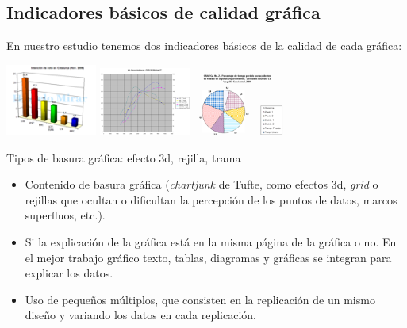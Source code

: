 \documentclass{tufte-handout}\usepackage{graphicx, color}
\begin{document}
\subsection{Indicadores básicos de calidad gráfica}

En nuestro estudio tenemos dos indicadores básicos de la 
calidad de cada gráfica:
\begin{marginfigure}
\includegraphics[width=3cm]{../doc/efecto_3d}
\includegraphics[width=3cm]{../doc/rejilla.png}
\includegraphics[width=3cm]{../doc/trama.png}
\caption{Tipos de basura gráfica: efecto 3d, rejilla, trama}
\end{marginfigure}

\begin{itemize}
\item Contenido de basura gráfica ({\em chartjunk} de Tufte, 
como efectos 3d, {\em grid} o rejillas
que ocultan o dificultan la percepción de los puntos de datos, marcos 
 superfluos, etc.).
\item Si la explicación de la gráfica está en la misma página de la gráfica o
no. En el mejor trabajo gráfico texto, tablas, diagramas y gráficas se
integran para explicar los datos.
\item Uso de pequeños múltiplos, que consisten en la replicación de un mismo
diseño y variando los datos en cada replicación.
\end{itemize}





\end{document}

